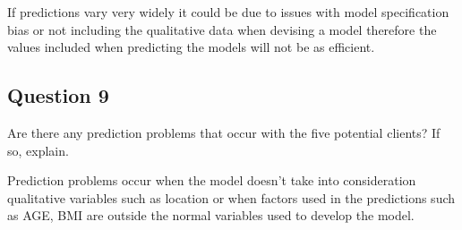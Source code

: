 \documentclass[
]{article}
\begin{document}
If predictions vary very widely it could be due to issues with model
specification bias or not including the qualitative data when devising a
model therefore the values included when predicting the models will not
be as efficient.

\hypertarget{question-9}{%
\subsection{Question 9}\label{question-9}}

Are there any prediction problems that occur with the five potential
clients? If so, explain.

Prediction problems occur when the model doesn't take into consideration
qualitative variables such as location or when factors used in the
predictions such as AGE, BMI are outside the normal variables used to
develop the model.
\end{document}
